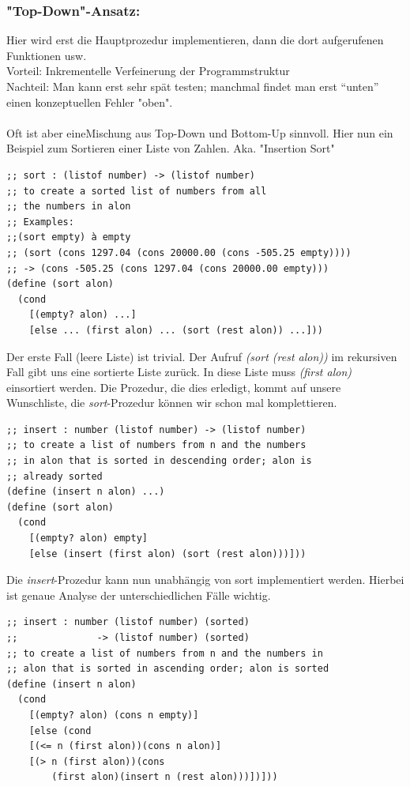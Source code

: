\subsubsection{"Top-Down"-Ansatz:}
Hier wird erst die Hauptprozedur implementieren, dann die dort aufgerufenen Funktionen usw.
\\Vorteil: Inkrementelle Verfeinerung der Programmstruktur
\\Nachteil: Man kann erst sehr spät testen; manchmal findet man erst “unten” einen konzeptuellen Fehler "oben". \\
\\Oft ist aber eineMischung aus Top-Down und Bottom-Up sinnvoll. Hier nun ein Beispiel zum Sortieren einer Liste von Zahlen. Aka. "Insertion Sort"
\begin{lstlisting}
;; sort : (listof number) -> (listof number)
;; to create a sorted list of numbers from all
;; the numbers in alon
;; Examples:
;;(sort empty) à empty
;; (sort (cons 1297.04 (cons 20000.00 (cons -505.25 empty))))
;; -> (cons -505.25 (cons 1297.04 (cons 20000.00 empty)))
(define (sort alon)
  (cond
    [(empty? alon) ...]
    [else ... (first alon) ... (sort (rest alon)) ...]))
\end{lstlisting}

Der erste Fall (leere Liste) ist trivial. Der Aufruf \textit{(sort (rest alon))} im rekursiven Fall gibt uns eine sortierte Liste zurück. In diese Liste muss \textit{(first alon)} einsortiert werden. Die Prozedur, die dies erledigt, kommt auf unsere Wunschliste,
die \textit{sort}-Prozedur können wir schon mal komplettieren.

\begin{lstlisting}
;; insert : number (listof number) -> (listof number)
;; to create a list of numbers from n and the numbers
;; in alon that is sorted in descending order; alon is
;; already sorted
(define (insert n alon) ...)
(define (sort alon)
  (cond
    [(empty? alon) empty]
    [else (insert (first alon) (sort (rest alon)))]))
\end{lstlisting}
Die \textit{insert}-Prozedur kann nun unabhängig von sort
implementiert werden. Hierbei ist genaue Analyse der unterschiedlichen Fälle wichtig.
\begin{lstlisting}
;; insert : number (listof number) (sorted)
;;              -> (listof number) (sorted)
;; to create a list of numbers from n and the numbers in
;; alon that is sorted in ascending order; alon is sorted
(define (insert n alon)
  (cond
    [(empty? alon) (cons n empty)]
    [else (cond
    [(<= n (first alon))(cons n alon)]
    [(> n (first alon))(cons
        (first alon)(insert n (rest alon)))])]))
\end{lstlisting}

